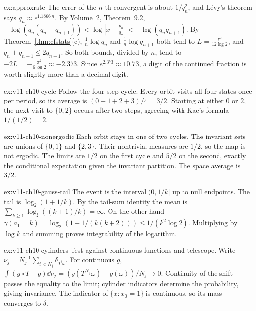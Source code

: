 \begin{solution}{ex:approxrate}
\idea The error of the $n$-th convergent is about $1/q_n^2$, and L\'evy's theorem says $q_n\approx e^{1.1866\,n}$.
\writeup By Volume~2, Theorem~9.2, $-\log(q_n(q_n+q_{n+1}))<\log|x-\frac{p_n}{q_n}|<-\log(q_nq_{n+1})$. By Theorem~\ref{thm:cfstats}(c), $\frac1n\log q_n$ and $\frac1n\log q_{n+1}$ both tend to $L=\frac{\pi^2}{12\log2}$, and $q_n+q_{n+1}\le2q_{n+1}$. So both bounds, divided by $n$, tend to $-2L=-\frac{\pi^2}{6\log2}\approx-2.373$.
Since $e^{2.373}\approx10.73$, a digit of the continued fraction is worth slightly more than a decimal digit.
\end{solution}

\begin{solution}{ex:v11-ch10-cycle}
\idea Follow the four-step cycle.
\writeup Every orbit visits all four states once per period, so its average is $(0+1+2+3)/4=3/2$. Starting at either $0$ or $2$, the next visit to $\{0,2\}$ occurs after two steps, agreeing with Kac's formula $1/(1/2)=2$.
\end{solution}

\begin{solution}{ex:v11-ch10-nonergodic}
\idea Each orbit stays in one of two cycles.
\writeup The invariant sets are unions of $\{0,1\}$ and $\{2,3\}$. Their nontrivial measures are $1/2$, so the map is not ergodic. The limits are $1/2$ on the first cycle and $5/2$ on the second, exactly the conditional expectation given the invariant partition. The space average is $3/2$.
\end{solution}

\begin{solution}{ex:v11-ch10-gauss-tail}
\idea The event is the interval $(0,1/k]$ up to null endpoints.
\writeup The tail is $\log_2(1+1/k)$. By the tail-sum identity the mean is $\sum_{k\ge1}\log_2((k+1)/k)=\infty$. On the other hand $\gamma(a_1=k)=\log_2(1+1/(k(k+2)))\le1/(k^2\log2)$. Multiplying by $\log k$ and summing proves integrability of the logarithm.
\end{solution}

\begin{solution}{ex:v11-ch10-cylinders}
\idea Test against continuous functions and telescope.
\writeup Write $\nu_j=N_j^{-1}\sum_{i<N_j}\delta_{T^i\omega}$. For continuous $g$, $\int(g\circ T-g)\dd\nu_j=(g(T^{N_j}\omega)-g(\omega))/N_j\to0$. Continuity of the shift passes the equality to the limit; cylinder indicators determine the probability, giving invariance. The indicator of $\{x:x_0=1\}$ is continuous, so its mass converges to $\delta$.
\end{solution}

